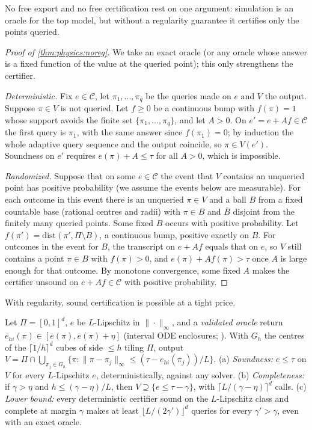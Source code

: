 No free export and no free certification rest on one argument: simulation is an oracle for
the top model, but without a regularity guarantee it certifies only the points queried.

\begin{proof}[Proof of \cref{thm:physics:noreg}]
We take an exact oracle (or any oracle whose answer is a fixed function of the value at the
queried point); this only strengthens the certifier.

\emph{Deterministic.} Fix $e\in\mathcal C$, let $\pi_1,\dots,\pi_q$ be the queries made on $e$
and $V$ the output. Suppose $\pi\in V$ is not queried. Let $f\ge0$ be a continuous bump with
$f(\pi)=1$ whose support avoids the finite set $\{\pi_1,\dots,\pi_q\}$, and let $A>0$. On
$e'=e+Af\in\mathcal C$ the first query is $\pi_1$, with the same answer since
$f(\pi_1)=0$; by induction the whole adaptive query sequence and the output coincide, so
$\pi\in V(e')$. Soundness on $e'$ requires $e(\pi)+A\le\tau$ for all $A>0$, which is
impossible.

\emph{Randomized.} Suppose that on some $e\in\mathcal C$ the event that $V$ contains an
unqueried point has positive probability (we assume the events below are measurable). For
each outcome in this event there is an unqueried $\pi\in V$ and a ball $B$ from a fixed
countable base (rational centres and radii) with $\pi\in B$ and $\overline B$ disjoint from the
finitely many queried points. Some fixed $B$ occurs with positive probability. Let
$f(\pi')=\mathrm{dist}(\pi',\Pi\setminus B)$, a continuous bump, positive exactly on $B$. For
outcomes in the event for $B$, the transcript on $e+Af$ equals that on $e$, so $V$ still
contains a point $\pi\in B$ with $f(\pi)>0$, and $e(\pi)+Af(\pi)>\tau$ once $A$ is large
enough for that outcome. By monotone convergence, some fixed $A$ makes the certifier unsound on
$e+Af\in\mathcal C$ with positive probability.
\end{proof}

With regularity, sound certification is possible at a tight price.

\begin{theorem}\label{thm:physics:lipschitz}
Let $\Pi=[0,1]^d$, $e$ be $L$-Lipschitz in $\|\cdot\|_\infty$, and a \emph{validated oracle}
return $e_{hi}(\pi)\in[e(\pi),e(\pi)+\eta]$ (interval ODE enclosures;
\citealt{tucker2011validated,immler2018verified}). With $G_h$ the centres of the
$\lceil1/h\rceil^d$ cubes of side $\le h$ tiling $\Pi$, output
$V=\Pi\cap\bigcup_{\pi_j\in G_h}\{\pi:\|\pi-\pi_j\|_\infty\le(\tau-e_{hi}(\pi_j))/L\}$. (a)
\emph{Soundness:} $e\le\tau$ on $V$ for every $L$-Lipschitz $e$, deterministically, against
any solver. (b) \emph{Completeness:} if $\gamma>\eta$ and $h\le(\gamma-\eta)/L$, then
$V\supseteq\{e\le\tau-\gamma\}$, with $\lceil L/(\gamma-\eta)\rceil^d$ calls. (c) \emph{Lower
bound:} every deterministic certifier sound on the $L$-Lipschitz class and complete at
margin $\gamma$ makes at least $\lfloor L/(2\gamma')\rfloor^d$ queries for every
$\gamma'>\gamma$, even with an exact oracle.
\hfill{}\ \ 
\end{theorem}

